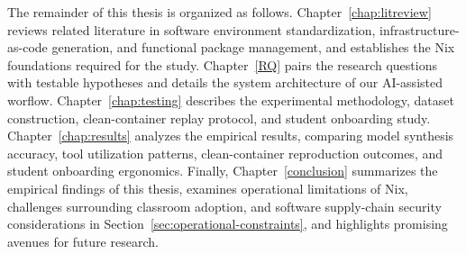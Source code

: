 The remainder of this thesis is organized as follows. Chapter~\ref{chap:litreview}
reviews related literature in software environment standardization,
infrastructure-as-code generation, and functional package management, and
establishes the Nix foundations required for the study. Chapter~\ref{RQ} pairs the
research questions with testable hypotheses and details the system architecture of
our AI-assisted worflow. Chapter~\ref{chap:testing} describes the experimental
methodology, dataset construction, clean-container replay protocol, and student onboarding
study. Chapter~\ref{chap:results} analyzes the empirical results, comparing model
synthesis accuracy, tool utilization patterns, clean-container reproduction outcomes,
and student onboarding ergonomics. Finally, Chapter~\ref{conclusion} summarizes
the empirical findings of this thesis, examines operational limitations of Nix,
challenges surrounding classroom adoption, and software supply-chain security considerations
in Section~\ref{sec:operational-constraints}, and highlights promising avenues
for future research.